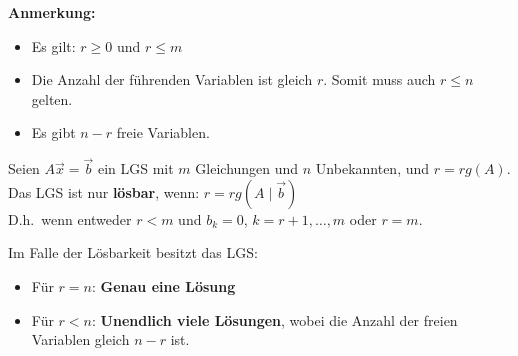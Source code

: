 \textbf{Anmerkung:}
\begin{itemize}
    \item Es gilt: $r \geq 0$ und $r \leq m$
    \item Die Anzahl der führenden Variablen ist gleich $r$.
    Somit muss auch $r \leq n$ gelten.
    \item Es gibt $n - r$ freie Variablen.
\end{itemize}

Seien $A \vec{x} = \vec{b}$ ein LGS mit $m$ Gleichungen und $n$ Unbekannten, und $r = rg(A)$.\\
Das LGS ist nur \textbf{lösbar}, wenn: $r = rg(A \mid \vec{b})$\\
D.h.\ wenn entweder $r < m$ und $b_k = 0$, $k = r + 1, \dots, m$ oder $r = m$.

Im Falle der Lösbarkeit besitzt das LGS:
\begin{itemize}
    \item Für $r = n$: \textbf{Genau eine Lösung}
    \item Für $r < n$: \textbf{Unendlich viele Lösungen}, wobei die Anzahl der freien Variablen gleich $n - r$ ist.
\end{itemize}

\columnbreak

